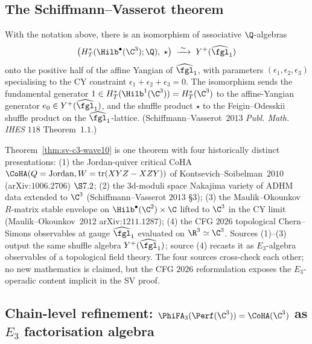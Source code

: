 \subsection*{The Schiffmann--Vasserot theorem}

\begin{theorem}
\label{thm:sv-c3-wave10}
\ClaimStatusProvedElsewhere
With the notation above, there is an isomorphism of associative
$\Q$-algebras
\[
 \bigl(H^*_T(\Hilb^\bullet(\C^3); \Q),\; \star\bigr)
 \;\xrightarrow{\;\sim\;}\;
 Y^+(\widehat{\fgl}_1)
\]
onto the positive half of the affine Yangian of $\widehat{\fgl}_1$,
with parameters $(\epsilon_1, \epsilon_2, \epsilon_3)$ specialising to
the CY constraint $\epsilon_1 + \epsilon_2 + \epsilon_3 = 0$. The
isomorphism sends the fundamental generator $1 \in H^*_T(\Hilb^1(\C^3))
= H^*_T(\C^3)$ to the affine-Yangian generator $e_0 \in
Y^+(\widehat{\fgl}_1)$, and the shuffle product $\star$ to the
Feigin--Odesskii shuffle product on the $\widehat{\fgl}_1$-lattice.
(Schiffmann--Vasserot~$2013$ \textit{Publ. Math. IHES} $118$
Theorem~$1.1$.)
\end{theorem}

\begin{remark}
\label{rem:sv-four-sources}
Theorem~\ref{thm:sv-c3-wave10} is one theorem with four historically
distinct presentations: (1) the Jordan-quiver critical CoHA
$\CoHA(Q = \text{Jordan}, W = \mathrm{tr}(XYZ - XZY))$ of
Kontsevich--Soibelman~$2010$ (arXiv:$1006.2706$) $\S 7.2$; (2) the
$3$d-moduli space Nakajima variety of ADHM data extended to $\C^3$
(Schiffmann--Vasserot $2013$ \S$3$); (3) the Maulik--Okounkov
$R$-matrix stable envelope on $\Hilb^\bullet(\C^2) \times \C$ lifted
to $\C^3$ in the CY limit (Maulik--Okounkov~$2012$ arXiv:$1211.1287$);
(4) the CFG $2026$ topological Chern--Simons observables at gauge
$\widehat{\fgl}_1$ evaluated on $\R^3 \simeq \C^3$. Sources (1)--(3)
output the same shuffle algebra $Y^+(\widehat{\fgl}_1)$; source (4)
recasts it as $E_3$-algebra observables of a topological field theory.
The four sources cross-check each other; no new mathematics is
claimed, but the CFG $2026$ reformulation exposes the $E_3$-operadic
content implicit in the SV proof.
\end{remark}

\subsection*{Chain-level refinement: $\PhiFA_3(\Perf(\C^3)) = \CoHA(\C^3)$ as $E_3$ factorisation algebra}

